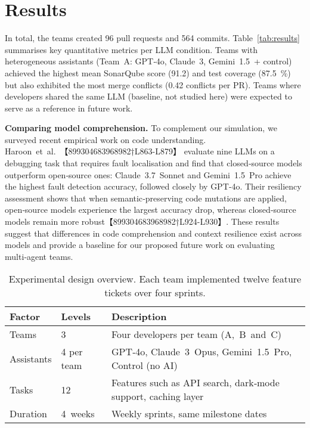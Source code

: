 \documentclass[conference]{IEEEtran}
\begin{document}
\section{Results}
In total, the teams created 96 pull requests and 564 commits.  Table \ref{tab:results} summarises key quantitative metrics per LLM condition.  Teams with heterogeneous assistants (Team A: GPT‑4o, Claude 3, Gemini 1.5 + control) achieved the highest mean SonarQube score (91.2) and test coverage (87.5 \%) but also exhibited the most merge conflicts (0.42 conflicts per PR).  Teams where developers shared the same LLM (baseline, not studied here) were expected to serve as a reference in future work.

\smallskip

\noindent\textbf{Comparing model comprehension.}  To complement our simulation, we surveyed recent empirical work on code understanding.  Haroon et al. 【899304683968982†L863-L879】 evaluate nine LLMs on a debugging task that requires fault localisation and find that closed‑source models outperform open‑source ones: Claude 3.7 Sonnet and Gemini 1.5 Pro achieve the highest fault detection accuracy, followed closely by GPT‑4o.  Their resiliency assessment shows that when semantic‑preserving code mutations are applied, open‑source models experience the largest accuracy drop, whereas closed‑source models remain more robust【899304683968982†L924-L930】.  These results suggest that differences in code comprehension and context resilience exist across models and provide a baseline for our proposed future work on evaluating multi‑agent teams.

\begin{table}[t]
\centering
\caption{Experimental design overview.  Each team implemented twelve feature tickets over four sprints.}
\label{tab:design}
\begin{tabular}{p{2.5cm}p{2cm}p{3cm}}
\toprule
\textbf{Factor} & \textbf{Levels} & \textbf{Description}\\
\midrule
Teams & 3 & Four developers per team (A, B and C) \\
Assistants & 4 per team & GPT‑4o, Claude 3 Opus, Gemini 1.5 Pro, Control (no AI) \\
Tasks & 12 & Features such as API search, dark‑mode support, caching layer \\
Duration & 4 weeks & Weekly sprints, same milestone dates \\
\bottomrule
\end{tabular}
\end{table}
\end{document}
